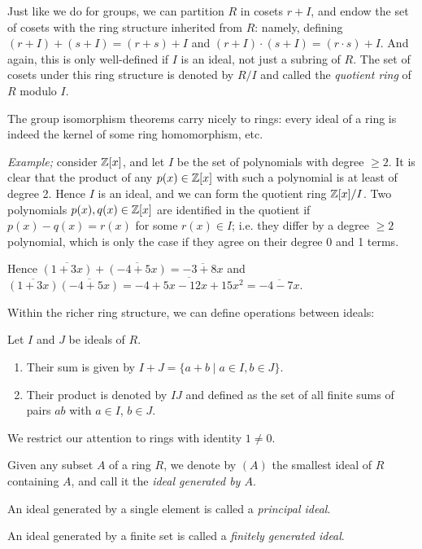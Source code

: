Just like we do for groups, we can partition $R$ in cosets $r+I$, and endow the set of cosets with the ring structure inherited from $R$: namely, defining $(r+I)+(s+I)=(r+s)+I$ and $(r+I)\cdot (s+I) = (r\cdot s) + I$. And again, this is only well-defined if $I$ is an ideal, not just a subring of $R$. The set of cosets under this ring structure is denoted by $R/I$ and called the \emph{quotient ring} of $R$ modulo $I$.

The group isomorphism theorems carry nicely to rings: every ideal of a ring is indeed the kernel of some ring homomorphism, etc.

\emph{Example;} consider $\mathbb{Z}[x]$, and let $I$ be the set of polynomials with degree $\geq 2$. It is clear that the product of any $p(x)\in\mathbb{Z}[x]$ with such a polynomial is at least of degree 2. Hence $I$ is an ideal, and we can form the quotient ring $\mathbb{Z}[x]/I$. Two polynomials $p(x),q(x)\in\mathbb{Z}[x]$ are identified in the quotient if $p(x)-q(x)=r(x)$ for some $r(x)\in I$; i.e. they differ by a degree $\geq 2$ polynomial, which is only the case if they agree on their degree 0 and 1 terms.

Hence $\overline{(1+3x)}+\overline{(-4+5x)}=\overline{-3+8x}$ and $\overline{(1+3x)}\overline{(-4+5x)}=\overline{-4+5x-12x+15x^2}=\overline{-4-7x}$.

Within the richer ring structure, we can define operations between ideals:

\begin{definition}
	Let $I$ and $J$ be ideals of $R$.
	\begin{enumerate}[(1)]
		\item Their sum is given by $I+J=\{a+b \mid a\in I, b\in J\}$.
		\item Their product is denoted by $IJ$ and defined as the set of all finite sums of pairs $ab$ with $a\in I$, $b\in J$.
	\end{enumerate}
\end{definition}

We restrict our attention to rings with identity $1\neq 0$.

\begin{definition}
	Given any subset $A$ of a ring $R$, we denote by $(A)$ the smallest ideal of $R$ containing $A$, and call it the \emph{ideal generated by $A$}.

	An ideal generated by a single element is called a \emph{principal ideal}.

	An ideal generated by a finite set is called a \emph{finitely generated ideal}.
\end{definition}


